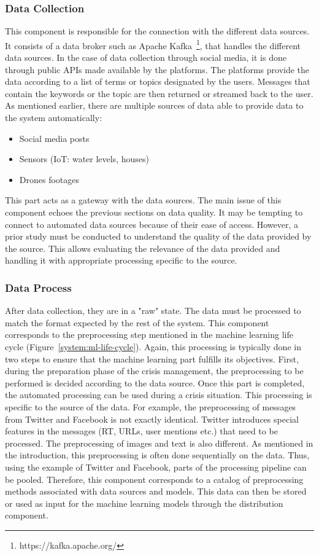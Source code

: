 \subsubsection{Data Collection}
This component is responsible for the connection with the different data sources.
It consists of a data broker such as Apache Kafka~\footnote{https://kafka.apache.org/}, that handles the different data sources.
In the case of data collection through social media, it is done through public APIs made
available by the platforms.
The platforms provide the data according to a list of terms or topics designated by the users.
Messages that contain the keywords or the topic are then returned or streamed back to the user.
As mentioned earlier, there are multiple sources of data able to provide data to the system automatically:

\begin{itemize}
    \item Social media posts
    \item Sensors (IoT: water levels, houses)
    \item Drones footages
\end{itemize}

This part acts as a gateway with the data sources.
The main issue of this component echoes the previous sections on data quality.
It may be tempting to connect to automated data sources because of their ease of access.
However, a prior study must be conducted to understand the quality of the data provided by the source.
This allows evaluating the relevance of the data provided and handling it with appropriate processing specific to the source.

\subsubsection{Data Process}
After data collection, they are in a "raw" state.
The data must be processed to match the format expected by the rest of the system.
This component corresponds to the preprocessing step mentioned in the machine learning life cycle (Figure~\ref{system:ml-life-cycle}).
Again, this processing is typically done in two steps to ensure that the machine learning part fulfills its objectives.
First, during the preparation phase of the crisis management, the preprocessing to be performed is decided according to the data source.
Once this part is completed, the automated processing can be used during a crisis situation.
This processing is specific to the source of the data.
For example, the preprocessing of messages from Twitter and Facebook is not exactly identical.
Twitter introduces special features in the messages (RT, URLs, user mentions etc.) that need to be processed.
The preprocessing of images and text is also different.
As mentioned in the introduction, this preprocessing is often done sequentially on the data.
Thus, using the example of Twitter and Facebook, parts of the processing pipeline can be pooled.
Therefore, this component corresponds to a catalog of preprocessing methods associated with data sources and models.
This data can then be stored or used as input for the machine learning models through the distribution component.

